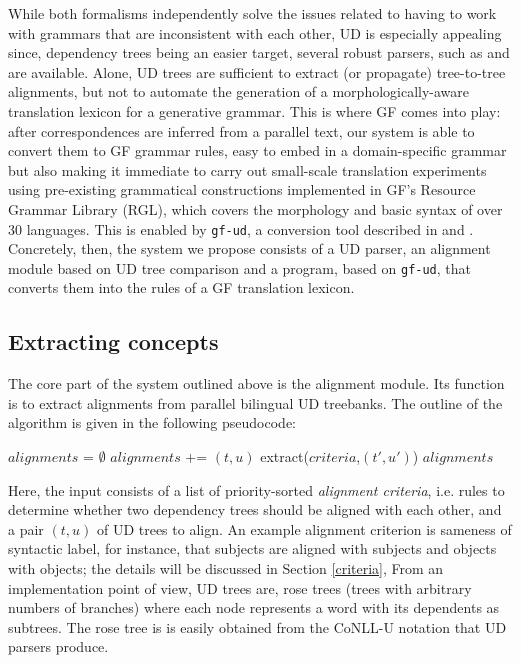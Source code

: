 \documentclass[11pt]{article}
\begin{document}
While both formalisms independently solve the issues related to having to work with grammars that are inconsistent with each other, UD is especially appealing since, dependency trees being an easier target, several robust parsers, such as \cite{straka-etal-2016-udpipe} and \cite{chen-manning-2014-fast} are available.
Alone, UD trees are sufficient to extract (or propagate) tree-to-tree alignments, but not to automate the generation of a morphologically-aware translation lexicon for a generative grammar. 
This is where GF comes into play: after correspondences are inferred from a parallel text, our system is able to convert them to GF grammar rules, easy to embed in a domain-specific grammar but also making it immediate to carry out small-scale translation experiments using pre-existing grammatical constructions implemented in GF's Resource Grammar Library (RGL), which covers the morphology and basic syntax of over 30 languages.
This is enabled by \texttt{gf-ud}, a conversion tool described in \cite{kolachina-ranta-2016-abstract} and \cite{ranta-kolachina-2017-universal}.
Concretely, then, the system we propose consists of a UD parser, an alignment module based on UD tree comparison and a program, based on \texttt{gf-ud}, that converts them into the rules of a GF translation lexicon.

\subsection{Extracting concepts} 
The core part of the system outlined above is the alignment module. 
Its function is to extract alignments from parallel bilingual UD treebanks.
The outline of the algorithm is given in the following pseudocode:

\begin{algorithm} 
  \small
  \begin{algorithmic}
    \State $alignments$ = $\emptyset$
        \State $alignments$ += $(t,u)$
          \State extract($criteria$,$(t',u')$)
        \EndFor
    \EndIf
    \Return $alignments$
  \EndProcedure
  \end{algorithmic}
  \end{algorithm}

Here, the input consists of a list of priority-sorted \textit{alignment criteria}, i.e. rules to determine whether two dependency trees should be aligned with each other, and a pair $(t,u)$ of UD trees to align.
An example alignment criterion is sameness of syntactic label, for instance, that subjects are aligned with subjects and objects with objects; the details will be discussed in Section \ref{criteria},  
From an implementation point of view, UD trees are, rose trees (trees with arbitrary numbers of branches) where each node represents a word with its dependents as subtrees.
The rose tree is is easily obtained from the CoNLL-U notation that UD parsers produce.
\end{document}
